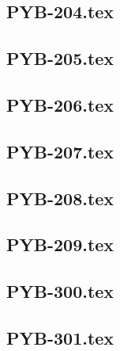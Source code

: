 \renewcommand{\xxexo}{PYB-204.tex} 
\subsection*{\xxexo} 
\graphicspath{{../../exospython_bases/equadiffs/\xxexo/}}
 
 
\renewcommand{\xxexo}{PYB-205.tex} 
\subsection*{\xxexo} 
\graphicspath{{../../exospython_bases/equadiffs/\xxexo/}}
 
 
\renewcommand{\xxexo}{PYB-206.tex} 
\subsection*{\xxexo} 
\graphicspath{{../../exospython_bases/equadiffs/\xxexo/}}
 
 
\renewcommand{\xxexo}{PYB-207.tex} 
\subsection*{\xxexo} 
\graphicspath{{../../exospython_bases/equadiffs/\xxexo/}}
 
 
\renewcommand{\xxexo}{PYB-208.tex} 
\subsection*{\xxexo} 
\graphicspath{{../../exospython_bases/equadiffs/\xxexo/}}
 
 
\renewcommand{\xxexo}{PYB-209.tex} 
\subsection*{\xxexo} 
\graphicspath{{../../exospython_bases/equadiffs/\xxexo/}}
 
 
\renewcommand{\xxexo}{PYB-300.tex} 
\subsection*{\xxexo} 
\graphicspath{{../../exospython_bases/equadiffs/\xxexo/}}
 
 
\renewcommand{\xxexo}{PYB-301.tex} 
\subsection*{\xxexo} 
\graphicspath{{../../exospython_bases/equadiffs/\xxexo/}}
 
 
